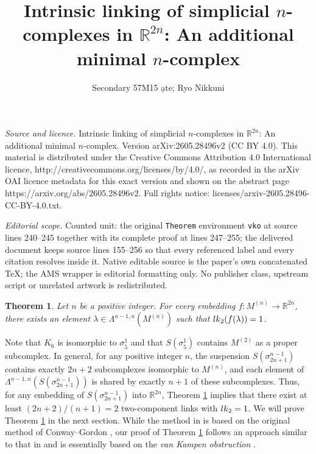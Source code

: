 \documentclass[10pt,a4paper]{amsart}
\newtheorem{Theorem}{Theorem}[section]
\numberwithin{equation}{section}
\begin{document}
\title[Intrinsic linking of simplicial n-complexes in mathbbR^2n: A]{Intrinsic linking of simplicial $n$-complexes in $\mathbb{R}^{2n}$: An additional minimal $n$-complex}
\author{Secondary 57M15 ạte; Ryo Nikkuni}
\date{}
\maketitle
\noindent\emph{Source and licence.} Intrinsic linking of simplicial $n$-complexes in $\mathbb{R}^{2n}$: An additional minimal $n$-complex. Version arXiv:2605.28496v2 (CC BY 4.0). This material is distributed under the Creative Commons Attribution 4.0 International licence, http://creativecommons.org/licenses/by/4.0/, as recorded in the arXiv OAI licence metadata for this exact version and shown on the abstract page https://arxiv.org/abs/2605.28496v2. Full rights notice: licenses/arxiv-2605.28496-CC-BY-4.0.txt.\par\smallskip
\noindent\textit{Editorial scope.} Counted unit: the original \texttt{Theorem} environment \texttt{vko} at source lines 240--245 together with its complete proof at lines 247--255; the delivered document keeps source lines 155--256 so that every referenced label and every citation resolves inside it. Native editable source is the paper's own concatenated TeX; the AMS wrapper is editorial formatting only. No publisher class, upstream script or unrelated artwork is redistributed.
\begin{Theorem}\label{ILR2n} 
Let $n$ be a positive integer. For every embedding $f \colon M^{(n)} \to \mathbb{R}^{2n}$, there exists an element $\lambda \in \Lambda^{n-1,n}(M^{(n)})$ such that ${\rm lk}_2(f(\lambda)) = 1$. 
\end{Theorem}

Note that $K_6$ is isomorphic to $\sigma_5^1$ and that $S(\sigma_5^1)$ contains $M^{(2)}$ as a proper subcomplex. In general, for any positive integer $n$, the suspension $S(\sigma_{2n+1}^{n-1})$ contains exactly $2n+2$ subcomplexes isomorphic to $M^{(n)}$, and each element of $\Lambda^{n-1,n}(S(\sigma_{2n+1}^{n-1}))$ is shared by exactly $n+1$ of these subcomplexes. Thus, for any embedding of $S(\sigma_{2n+1}^{n-1})$ into $\mathbb{R}^{2n}$, Theorem \ref{ILR2n} implies that there exist at least $(2n+2)/(n+1) = 2$ two-component links with ${\rm lk}_2 = 1$. We will prove Theorem \ref{ILR2n} in the next section. While the method in \cite{HRJV26} is based on the original method of Conway--Gordon \cite{CG83}, our proof of Theorem \ref{ILR2n} follows an approach similar to that in \cite{N26b} and is essentially based on the \textit{van Kampen obstruction} \cite{VK33}.
\end{document}
